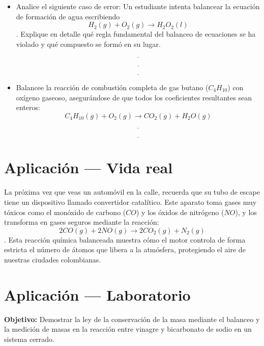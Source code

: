\documentclass[
  spanish,
  letterpaper,
  12pt,
  oneside,
  open=any]{scrbook}
\newcommand{\setcolorsection}[2]{%
  \definecolor{currentsectionbg}{HTML}{#1}%
  \definecolor{currentsectionborder}{HTML}{#2}%
}
\begin{document}
\begin{itemize}
\item
  Analice el siguiente caso de error: Un estudiante intenta balancear la
  ecuación de formación de agua escribiendo
  \[H_2(g) + O_2(g) \rightarrow H_2O_2(l)\]. Explique en detalle qué
  regla fundamental del balanceo de ecuaciones se ha violado y qué
  compuesto se formó en su lugar.

  \[\underline{\hspace{6cm}}\]

  \[\underline{\hspace{6cm}}\]

  \[\underline{\hspace{6cm}}\]
\item
  Balancee la reacción de combustión completa de gas butano
  (\(C_4H_{10}\)) con oxígeno gaseoso, asegurándose de que todos los
  coeficientes resultantes sean enteros:
  \[C_4H_{10}(g) + O_2(g) \rightarrow CO_2(g) + H_2O(g)\]

  \[\underline{\hspace{6cm}}\]

  \[\underline{\hspace{6cm}}\]
\end{itemize}

\setcolorsection{c5e8d8}{a8d4c4}

\section{Aplicación --- Vida real}\label{aplicaciuxf3n-vida-real-1}

La próxima vez que veas un automóvil en la calle, recuerda que su tubo
de escape tiene un dispositivo llamado convertidor catalítico. Este
aparato toma gases muy tóxicos como el monóxido de carbono (\(CO\)) y
los óxidos de nitrógeno (\(NO\)), y los transforma en gases seguros
mediante la reacción: \[2CO(g) + 2NO(g) \rightarrow 2CO_2(g) + N_2(g)\].
Esta reacción química balanceada muestra cómo el motor controla de forma
estricta el número de átomos que libera a la atmósfera, protegiendo el
aire de nuestras ciudades colombianas.

\setcolorsection{c5e8d8}{a8d4c4}

\section{Aplicación --- Laboratorio}\label{aplicaciuxf3n-laboratorio-1}

\textbf{Objetivo:} Demostrar la ley de la conservación de la masa
mediante el balanceo y la medición de masas en la reacción entre vinagre
y bicarbonato de sodio en un sistema cerrado.
\end{document}
